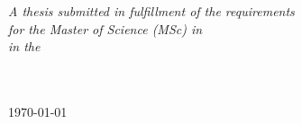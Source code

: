 \documentclass[
11pt, %
english, %
onehalfspacing, %
parskip, %
headsepline, %
]{MastersDoctoralThesis} %
\begin{document}
\begin{titlepage}
\begin{center}
\vfill

\large \textit{A thesis submitted in fulfillment of the requirements\\ for the Master of Science (MSc) in \degreename}\\[0.3cm] %
\textit{in the}\\[0.4cm]
\facname\\\deptname\\[1cm] %
 
\vfill

{\large \today}\\[4cm] %
 
\vfill
\end{center}
\end{titlepage}



 
\end{document}
